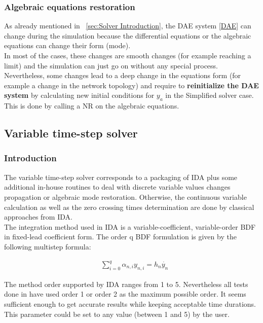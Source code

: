 \documentclass[a4paper, 12pt]{report}
\begin{document}
\subsubsection{Algebraic equations restoration}

As already mentioned in ~\ref{sec:Solver Introduction}, the \ac{DAE} system \eqref{DAE} can change during the simulation because the differential equations or the algebraic equations can change their form (mode). \\

In most of the cases, these changes are smooth changes (for example reaching a limit) and the simulation can just go on without any special process. Nevertheless, some changes lead to a deep change in the  equations form (for example a change in the network topology) and require to \textbf{reinitialize the \ac{DAE} system} by calculating new initial conditions for $y_a$ in the Simplified solver case.
This is done by calling a \ac{NR} on the algebraic equations.

\subsection{Variable time-step solver}

\subsubsection{Introduction}

The variable time-step solver corresponds to a packaging of \ac{IDA} plus some additional in-house routines to deal with discrete variable values changes propagation or algebraic mode restoration. Otherwise, the continuous variable calculation as well as the zero crossing times determination are done by classical approaches from \ac{IDA}. \\

The integration method used in \ac{IDA} is a variable-coefficient, variable-order \ac{BDF} in fixed-lead coefficient form. The order q BDF formulation is given by the following multistep formula:

\begin{equation}
\begin{aligned}
& \sum\limits_{i=0}^q \alpha_{n,i} y_{n,i} = h_{n}\dot{y_n}
\end{aligned}
\end{equation}

The method order supported by \ac{IDA} ranges from 1 to 5. Nevertheless all tests done in \Dynawo have used order 1 or order 2 as the maximum possible order. It seems sufficient enough to get accurate results while keeping acceptable time durations. This parameter could be set to any value (between 1 and 5) by the user. \\
\end{document}
